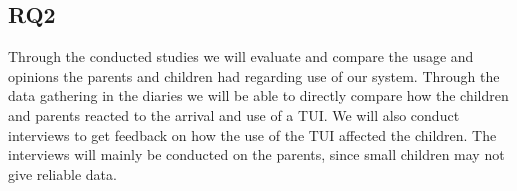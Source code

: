 \subsection{RQ2}
\label{sec: RQ3-methodology}

Through the conducted studies we will evaluate and compare the usage and opinions the parents and children had regarding use of our system. Through the data gathering in the diaries we will be able to directly compare how the children and parents reacted to the arrival and use of a TUI. We will also conduct interviews to get feedback on how the use of the TUI affected the children. The interviews will mainly be conducted on the parents, since small children may not give reliable data.
